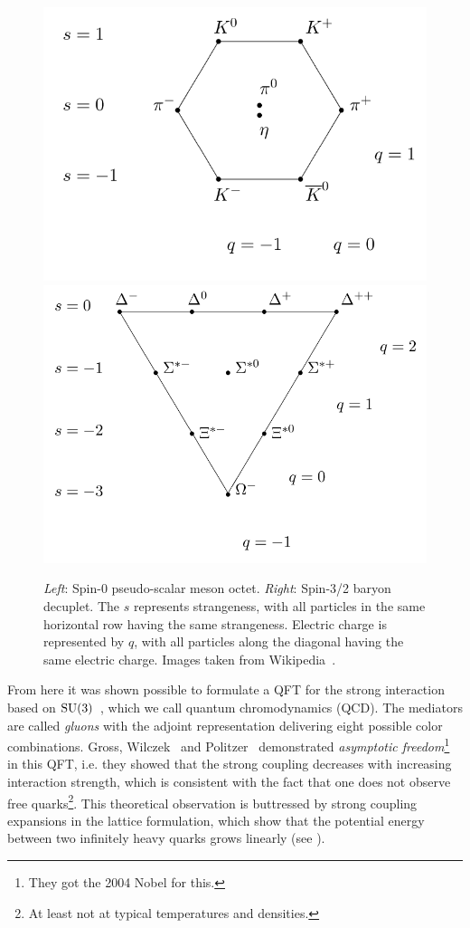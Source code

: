 \begin{figure}[t]
  \centering
  \includegraphics[width=0.48\linewidth]{figs/Meson_octet.png}
  \includegraphics[width=0.48\linewidth]{figs/Baryon_decuplet.png}
  \caption{{\it Left}: Spin-0 pseudo-scalar meson octet. {\it Right}:
           Spin-3/2 baryon decuplet. The $s$ represents strangeness,
           with all particles in the same horizontal row having the
           same strangeness. Electric charge is represented by $q$,
           with all particles along the diagonal having the same
           electric charge. Images taken from
           Wikipedia~\cite{wiki_eightfold}.}
  \label{fig:eightfold}
\end{figure}

From here it was shown possible to formulate a QFT for the strong interaction
based on $\operatorname{SU}(3)$~\cite{fritzsch_advantages_1973}, which we
call quantum chromodynamics (QCD).
The mediators are called
{\it gluons} with the adjoint representation delivering
eight possible color combinations.
Gross, Wilczek~\cite{gross_d.j._ultraviolet_1973} and
Politzer~\cite{politzer_reliable_1973} demonstrated
{\it asymptotic freedom}\footnote{They got the 2004 Nobel for this.}
 in this QFT, i.e. they showed that the
strong coupling decreases with increasing interaction strength, which is
consistent with the fact that one does not observe free quarks\footnote{At
least not at typical temperatures and densities.}.
This theoretical observation is buttressed by strong coupling
expansions in the lattice formulation, which show that the potential
energy between two infinitely heavy quarks grows linearly
(see ).

